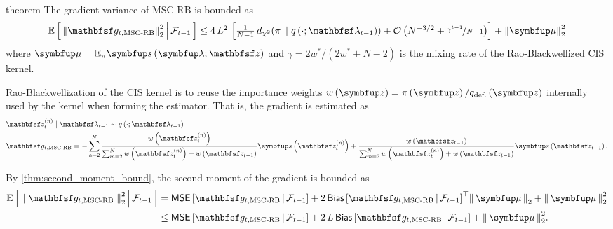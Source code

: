 \begin{theoremEnd}{theorem}{\citep{cardoso_brsnis_2022}}\label{thm:mscrb}
  The gradient variance of MSC-RB is bounded as
  {%
  \begin{align*}
  {\textstyle
    \E{ {\lVert \rvvg_{t,\mathrm{MSC\text{-}RB}} \rVert}_2^2  \,\middle|\, \mathcal{F}_{t-1} }
    \leq
    4 \, L^2 \,\left[
    \frac{1}{N-1}\,\DChi{\pi}{q\left(\cdot; \rvvlambda_{t-1}\right)} 
    +
    \mathcal{O}\left(N^{-3/2} + \nicefrac{\gamma^{t-1}}{N-1}\right)
    \right]
    +
    {\lVert\vmu\rVert}^2_2
  }
  \end{align*}
  }%
  where \(\vmu = \mathbb{E}_{\pi}\vs\left(\vlambda;\rvvz\right)\) and \(\gamma = 2 w^* / \left(2 w^* + N - 2\right)\) is the mixing rate of the Rao-Blackwellized CIS kernel.
\end{theoremEnd}
\begin{proofEnd}
  Rao-Blackwellization of the CIS kernel is to reuse the importance weights \(w\left(\vz\right) = \pi\left(\vz\right) / q_{\text{def.}}\left(\vz\right)\) internally used by the kernel when forming the estimator.
  That is, the gradient is estimated as
  \begin{align*}
    &\rvvz^{(n)}_t \mid \rvvlambda_{t-1} \sim q\left(\cdot; \rvvlambda_{t-1}\right) \\
    &\rvvg_{t,\text{MSC-RB}} = -\sum^{N}_{n=2} \frac{w\left(\rvvz^{(n)}_t\right)}{\sum^{N}_{m=2}w\left(\rvvz^{(n)}_t\right) + w\left(\rvvz_{t-1}\right)} \vs\left(\rvvz^{(n)}_t\right) + \frac{w\left(\rvvz_{t-1}\right)}{\sum^{N}_{m=2}w\left(\rvvz^{(n)}_t\right) + w\left(\rvvz_{t-1}\right)} \vs\left(\rvvz_{t-1}\right).
  \end{align*}

  By \cref{thm:second_moment_bound}, the second moment of the gradient is bounded as
  \begin{alignat}{2}
    \E{ {\parallel \rvvg_{t,\text{MSC-RB}} \parallel}_2^2 \,\middle|\, \mathcal{F}_{t-1} } 
    &=
    \mathsf{MSE}\left[ \rvvg_{t, \text{MSC-RB}} \,\middle|\, \mathcal{F}_{t-1} \right]
    +
    2 \, {\mathsf{Bias}\left[ \rvvg_{t, \text{MSC-RB}} \,\middle|\, \mathcal{F}_{t-1} \right]}^{\top} \norm{\vmu}_2
    + \norm{\vmu}^2_2
    \nonumber
    \\
    &\leq
    \mathsf{MSE}\left[ \rvvg_{t, \text{MSC-RB}} \,\middle|\, \mathcal{F}_{t-1} \right]
    +
    2 \, L \, {\mathsf{Bias}\left[ \rvvg_{t, \text{MSC-RB}} \,\middle|\, \mathcal{F}_{t-1} \right]}
    + \norm{\vmu}^2_2.
    \label{eq:mscrb_decomp}
  \end{alignat}
  

\end{proofEnd}
